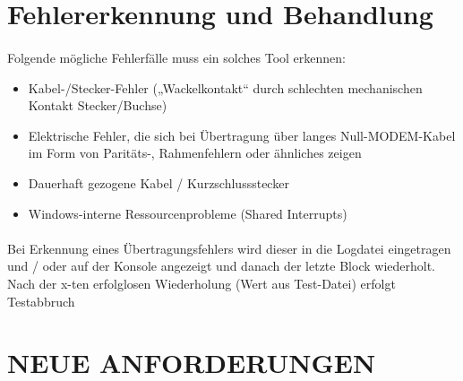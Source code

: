 \section{Fehlererkennung und Behandlung}
\paragraph{}
Folgende mögliche Fehlerfälle muss ein solches Tool erkennen:
\begin{itemize}
\item Kabel-/Stecker-Fehler („Wackelkontakt“ durch schlechten mechanischen Kontakt Stecker/Buchse) 
\item Elektrische Fehler, die sich bei Übertragung über langes Null-MODEM-Kabel im Form von Paritäts-, Rahmenfehlern oder ähnliches zeigen
\item Dauerhaft gezogene Kabel / Kurzschlussstecker
\item Windows-interne Ressourcenprobleme (Shared Interrupts)
\end{itemize} 
\paragraph{}
Bei Erkennung eines Übertragungsfehlers wird dieser in die Logdatei eingetragen und / oder auf der Konsole angezeigt und danach der letzte Block wiederholt. Nach der x-ten erfolglosen Wiederholung (Wert aus Test-Datei) erfolgt Testabbruch

\section{NEUE ANFORDERUNGEN}
